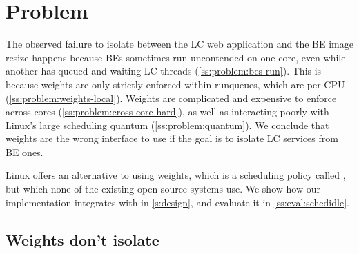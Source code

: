 \section{Problem}\label{s:problem}

The observed failure to isolate between the LC web application and the BE image
resize happens because BEs sometimes run uncontended on one core, even while
another has queued and waiting LC threads (\autoref{ss:problem:bes-run}). This
is because weights are only strictly enforced within runqueues, which are
per-CPU (\autoref{ss:problem:weights-local}). Weights are complicated and
expensive to enforce across cores (\autoref{ss:problem:cross-core-hard}), as
well as interacting poorly with Linux's large scheduling quantum
(\autoref{ss:problem:quantum}). We conclude that weights are the wrong interface
to use if the goal is to isolate LC services from BE ones.

Linux offers an alternative to using \cgroups{} weights, which is a scheduling
policy called \schedidle{}, but which none of the existing open source systems
use. We show how our implementation integrates with \schedidle{} in
\autoref{s:design}, and evaluate it in \autoref{ss:eval:schedidle}.


\subsection{Weights don't isolate}\label{ss:problem:bes-run}

